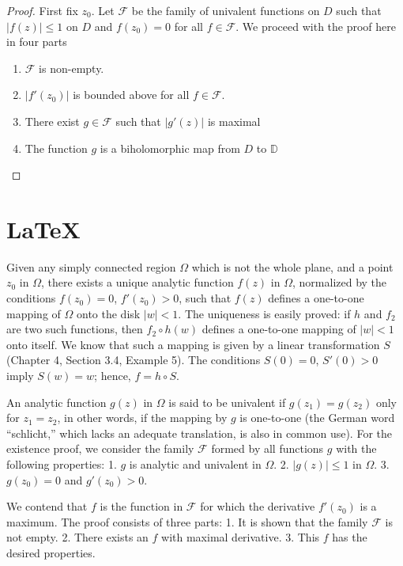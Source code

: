 \documentclass[
]{book}
\providecommand{\tightlist}{%
  \setlength{\itemsep}{0pt}\setlength{\parskip}{0pt}}
\theoremstyle{definition}
\theoremstyle{definition}
\theoremstyle{definition}
\theoremstyle{definition}
\theoremstyle{remark}
\begin{document}
\begin{proof}

First fix \(z_0\). Let \(\mathcal{F}\) be the family of univalent functions on \(D\) such that \(|f(z)|\leq 1\) on \(D\) and \(f(z_0)=0\) for all \(f \in \mathcal{F}\). We proceed with the proof here in four parts

\begin{enumerate}
\def\labelenumi{\roman{enumi}.}
\tightlist
\item
  \(\mathcal{F}\) is non-empty.
\item
  \(|f'(z_0)|\) is bounded above for all \(f\in \mathcal{F}\).
\item
  There exist \(g\in \mathcal{F}\) such that \(|g'(z)|\) is maximal
\item
  The function \(g\) is a biholomorphic map from \(D\) to \(\mathbb{D}\)
\end{enumerate}

\end{proof}

\section{LaTeX}\label{latex}

Given any simply connected region \(\Omega\) which is not the whole plane, and a point \(z_0\) in \(\Omega\), there exists a unique analytic function \(f(z)\) in \(\Omega\), normalized by the conditions \(f(z_0) = 0\), \(f'(z_0) > 0\), such that \(f(z)\) defines a one-to-one mapping of \(\Omega\) onto the disk \(|w| < 1\). The uniqueness is easily proved: if \(h\) and \(f_2\) are two such functions, then \(f_2 \circ h(w)\) defines a one-to-one mapping of \(|w| < 1\) onto itself. We know that such a mapping is given by a linear transformation \(S\) (Chapter 4, Section 3.4, Example 5). The conditions \(S(0) = 0\), \(S'(0) > 0\) imply \(S(w) = w\); hence, \(f = h \circ S\).

An analytic function \(g(z)\) in \(\Omega\) is said to be univalent if \(g(z_1) = g(z_2)\) only for \(z_1 = z_2\), in other words, if the mapping by \(g\) is one-to-one (the German word ``schlicht,'' which lacks an adequate translation, is also in common use). For the existence proof, we consider the family \(\mathcal{F}\) formed by all functions \(g\) with the following properties:
1. \(g\) is analytic and univalent in \(\Omega\).
2. \(|g(z)| \leq 1\) in \(\Omega\).
3. \(g(z_0) = 0\) and \(g'(z_0) > 0\).

We contend that \(f\) is the function in \(\mathcal{F}\) for which the derivative \(f'(z_0)\) is a maximum. The proof consists of three parts:
1. It is shown that the family \(\mathcal{F}\) is not empty.
2. There exists an \(f\) with maximal derivative.
3. This \(f\) has the desired properties.
\end{document}
